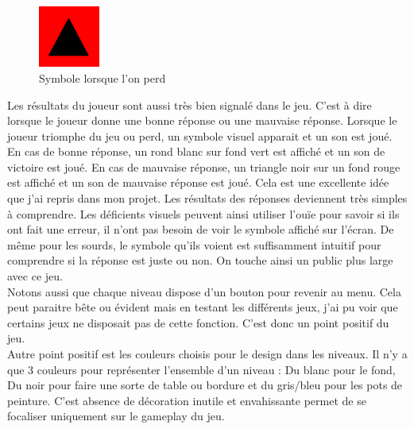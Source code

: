 \documentclass{article}
\begin{document}
\begin{figure}
  \vspace{-20pt}
  \begin{center}
    \includegraphics[width=0.18\textwidth]{5}
  \end{center}
  \vspace{-20pt}
  \caption{Symbole lorsque l'on perd}
  \vspace{-10pt}
\end{figure}

Les résultats du joueur sont aussi très bien signalé dans le jeu. C'est à dire lorsque le joueur donne une bonne réponse ou une mauvaise réponse. Lorsque le joueur triomphe du jeu ou perd, un symbole visuel apparait et un son est joué. En cas de bonne réponse, un rond blanc sur fond vert est affiché et un son de victoire est joué. En cas de mauvaise réponse, un triangle noir sur un fond rouge est affiché et un son de mauvaise réponse est joué. Cela est une excellente idée que j'ai repris dans mon projet. Les résultats des réponses deviennent très simples à comprendre. Les déficients visuels peuvent ainsi utiliser l'ouïe pour savoir si ils ont fait une erreur, il n'ont pas besoin de voir le symbole affiché sur l'écran. De même pour les sourds, le symbole qu'ils voient est suffisamment intuitif pour comprendre si la réponse est juste ou non. On touche ainsi un public plus large avec ce jeu.\\

Notons aussi que chaque niveau dispose d'un bouton pour revenir au menu. Cela peut paraitre bête ou évident mais en testant les différents jeux, j'ai pu voir que certains jeux ne disposait pas de cette fonction. C'est donc un point positif du jeu.\\

Autre point positif est les couleurs choisis pour le design dans les niveaux. Il n'y a que 3 couleurs pour représenter l'ensemble d'un niveau : Du blanc pour le fond, Du noir pour faire une sorte de table ou bordure et du gris/bleu pour les pots de peinture. C'est absence de décoration inutile et envahissante permet de se focaliser uniquement sur le gameplay du jeu.

\newpage
\end{document}
